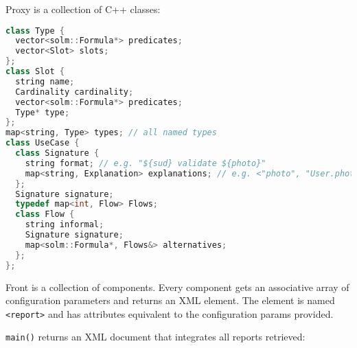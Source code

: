 \documentclass{article}
\begin{document}
    
    \clearpage
    Proxy is a collection of C++ classes:
    
    \begin{lstlisting}[language=C++]
class Type {
  vector<solm::Formula*> predicates;
  vector<Slot> slots;
};
class Slot {
  string name;
  Cardinality cardinality;
  vector<solm::Formula*> predicates;
  Type* type;
};
map<string, Type> types; // all named types
class UseCase {
  class Signature {
    string format; // e.g. "${sud} validate ${photo}"
    map<string, Explanation> explanations; // e.g. <"photo", "User.photos">
  };
  Signature signature;
  typedef map<int, Flow> Flows;
  class Flow {
    string informal;
    Signature signature;
    map<solm::Formula*, Flows&> alternatives;
  };
};
\end{lstlisting}

    Front is a collection of components. Every component gets
    an associative array of configuration parameters 
    and returns an XML element. The element is named \texttt{<report>}
    and has attributes equivalent to the configuration
    params provided.
    
    \texttt{main()} returns an XML document that integrates
    all reports retrieved:
    
\end{document}
